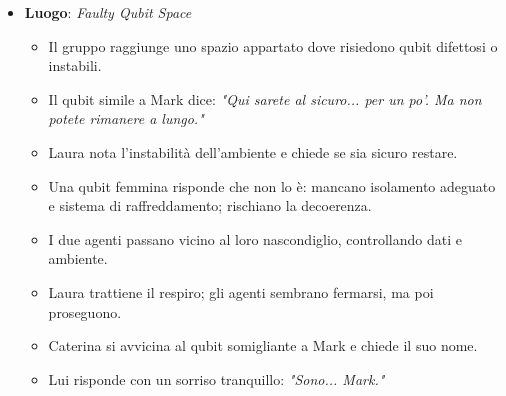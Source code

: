 \begin{itemize}
    \item \textbf{Luogo}: \emph{Faulty Qubit Space}
    \begin{itemize}
        \item Il gruppo raggiunge uno spazio appartato dove risiedono qubit difettosi o instabili.
        \item Il qubit simile a Mark dice: \emph{"Qui sarete al sicuro... per un po'. Ma non potete rimanere a lungo."}
        \item Laura nota l'instabilità dell'ambiente e chiede se sia sicuro restare.
        \item Una qubit femmina risponde che non lo è: mancano isolamento adeguato e sistema di raffreddamento; rischiano la decoerenza.
        \item I due agenti passano vicino al loro nascondiglio, controllando dati e ambiente.
        \item Laura trattiene il respiro; gli agenti sembrano fermarsi, ma poi proseguono.
        \item Caterina si avvicina al qubit somigliante a Mark e chiede il suo nome.
        \item Lui risponde con un sorriso tranquillo: \emph{"Sono... Mark."}
    \end{itemize}
\end{itemize}


